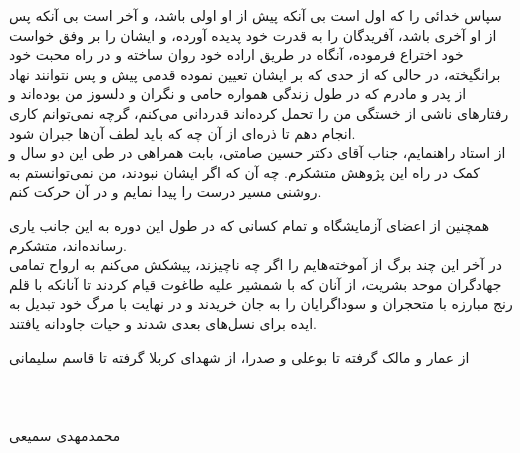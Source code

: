 \thispagestyle{empty}

{\nastaliq
سپاس خدائى را كه اول است بى آنكه پيش از او اولى باشد، و آخر است بى آنكه پس از او آخرى باشد، آفريدگان را به قدرت خود پديده آورده، و ايشان را بر وفق خواست خود اختراع فرموده، آنگاه در طريق اراده خود روان ساخته و در راه محبت خود برانگيخته، در حالى كه از حدى كه بر ايشان تعيين نموده قدمى پيش و پس نتوانند نهاد 
\\
از پدر و مادرم که در طول زندگی همواره حامی و نگران و دلسوز من‌ بوده‌اند و  رفتارهای ناشی از خستگی‌ من را تحمل کرده‌اند قدردانی می‌کنم، گرچه نمی‌توانم کاری انجام دهم تا ذره‌ای از آن چه که باید لطف آن‌ها جبران شود.
\\
از استاد راهنمایم، جناب آقای دکتر حسین صامتی،‌ بابت همراهی در طی این دو سال و کمک در راه این پژوهش متشکرم. چه آن که اگر ایشان نبودند، من نمی‌توانستم به روشنی مسیر درست را پیدا نمایم و در آن حرکت کنم.

همچنین از اعضای آزمایشگاه و تمام کسانی که در طول این دوره  به این جانب یاری رسانده‌اند، متشکرم.
\\
در آخر این چند برگ از آموخته‌هایم را اگر چه ناچیزند، پیشکش می‌کنم به ارواح تمامی جهادگران موحد بشریت، از آنان که با شمشیر علیه طاغوت قیام کردند تا آنانکه با قلم رنج مبارزه با متحجران و سوداگرایان را به جان خریدند و در نهایت با مرگ خود تبدیل به ایده‌ برای نسل‌های بعدی شدند و حیات جاودانه یافتند. 

از عمار و مالک گرفته تا بوعلی و صدرا، از شهدای کربلا گرفته تا قاسم سلیمانی
\\
\\
\\
\\
\vspace{1cm}
محمدمهدی سمیعی
}
\newpage\clearpage